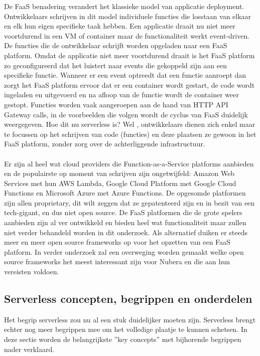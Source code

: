 De FaaS benadering verandert het klassieke model van applicatie deployment. Ontwikkelaars schrijven in dit model individuele functies die losstaan van elkaar en elk hun eigen specifieke taak hebben. Een applicatie draait nu niet meer voortdurend in een VM of container maar de functionaliteit werkt event-driven. De functies die de ontwikkelaar schrijft worden opgeladen naar een FaaS platform. Omdat de applicatie niet meer voortdurend draait is het FaaS platform zo geconfigureerd dat het luistert naar events die gekoppeld zijn aan een specifieke functie. Wanneer er een event optreedt dat een functie aanroept dan zorgt het FaaS platform ervoor dat er een container wordt gestart, de code wordt ingeladen en uitgevoerd en na afloop van de functie wordt de container weer gestopt. Functies worden vaak aangeroepen aan de hand van HTTP API Gateway calls, in de voorbeelden die volgen wordt de cyclus van FaaS duidelijk weergegeven. Hoe dit nu serverless is? Wel , ontwikkelaars dienen zich enkel maar te focussen op het schrijven van code (functies) en deze plaatsen ze gewoon in het FaaS platform, zonder zorg over de achterliggende infrastructuur.\autocite{Roberts2017}
\\\\
Er zijn al heel wat cloud providers die Function-as-a-Service platforms aanbieden en de populairste op moment van schrijven zijn ongetwijfeld: Amazon Web Services met hun AWS Lambda, Google Cloud Platform met Google Cloud Functions en Microsoft Azure met Azure Functions. De opgesomde platformen zijn allen proprietary,  dit wilt zeggen dat ze gepatenteerd zijn en in bezit van een tech-gigant, en dus niet open source. De FaaS platformen die de grote spelers aanbieden zijn al ver ontwikkeld en bieden heel wat functionaliteit maar zullen niet verder behandeld worden in dit onderzoek. Als alternatief duiken er steeds meer en meer open source frameworks op voor het opzetten van een FaaS platform. In verder onderzoek zal een overweging worden gemaakt welke  open source frameworks het meest interessant zijn voor Nubera en die aan hun vereisten voldoen.

\subsection{Serverless concepten, begrippen en onderdelen}
Het begrip serverless zou nu al een stuk duidelijker moeten zijn. Serverless brengt echter nog meer begrippen mee om het volledige plaatje te kunnen schetsen. In deze sectie worden de belangrijkste ''key concepts'' met bijhorende begrippen nader verklaard.

